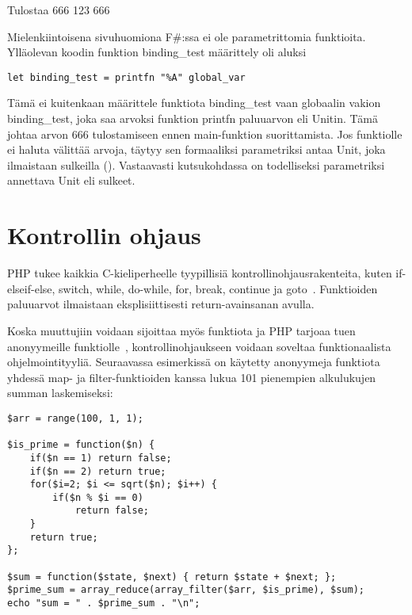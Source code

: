 Tulostaa 666 123 666

Mielenkiintoisena sivuhuomiona F\#:ssa ei ole parametrittomia funktioita. Ylläolevan koodin funktion binding\_test määrittely oli aluksi

\begin{lstlisting}
let binding_test = printfn "%A" global_var
\end{lstlisting}

Tämä ei kuitenkaan määrittele funktiota binding\_test vaan globaalin vakion binding\_test, joka saa arvoksi funktion printfn paluuarvon eli Unitin. Tämä johtaa arvon 666 tulostamiseen ennen main-funktion suorittamista. Jos funktiolle ei haluta välittää arvoja, täytyy sen formaaliksi parametriksi antaa Unit, joka ilmaistaan sulkeilla (). Vastaavasti kutsukohdassa on  todelliseksi parametriksi annettava Unit eli sulkeet.



\section{Kontrollin ohjaus}

PHP tukee kaikkia C-kieliperheelle tyypillisiä kontrollinohjausrakenteita, kuten if-elseif-else, switch, while, do-while, for, break, continue ja goto~\cite{man_php_control}. Funktioiden paluuarvot ilmaistaan eksplisiittisesti return-avainsanan avulla.
\par
Koska muuttujiin voidaan sijoittaa myös funktiota ja PHP tarjoaa tuen anonyymeille funktiolle~\cite{man_php_anon}, kontrollinohjaukseen voidaan soveltaa funktionaalista ohjelmointityyliä. Seuraavassa esimerkissä on käytetty anonyymeja funktiota yhdessä map- ja filter-funktioiden kanssa lukua 101 pienempien alkulukujen summan laskemiseksi:

\lstset{language=PHP,
	basicstyle=\ttfamily,
	breaklines=true,
	columns=fullflexible}

\begin{lstlisting}
$arr = range(100, 1, 1);

$is_prime = function($n) {
    if($n == 1) return false;
    if($n == 2) return true;
    for($i=2; $i <= sqrt($n); $i++) {
        if($n % $i == 0)
            return false;
    }
    return true;
};

$sum = function($state, $next) { return $state + $next; };
$prime_sum = array_reduce(array_filter($arr, $is_prime), $sum);
echo "sum = " . $prime_sum . "\n";
\end{lstlisting}

